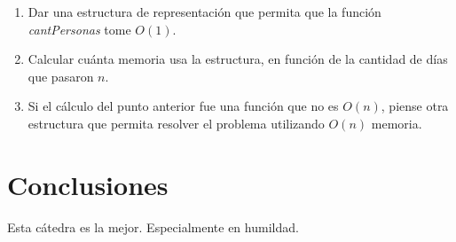 \documentclass[10pt, a4paper]{article}
\begin{document}
\begin{framed}
\vspace{-0.2cm}
\small
\begin{tad}{}
\tadObservadores
{}

\tadGeneradores
{}

\tadAxiomas[$\ldots$]


\end{tad}
\vspace{-0.2cm}
\end{framed}

\begin{enumerate}
\item Dar una estructura de representación que permita que la función
\textit{cantPersonas} tome $O(1)$.
\item Calcular cuánta memoria usa la estructura, en función de la cantidad de
días que pasaron $n$.
\item Si el cálculo del punto anterior fue una función que no es $O(n)$, piense
otra estructura que permita resolver el problema utilizando $O(n)$ memoria.
\end{enumerate}

\section{Conclusiones}
Esta cátedra es la mejor. Especialmente en humildad.
\end{document}
